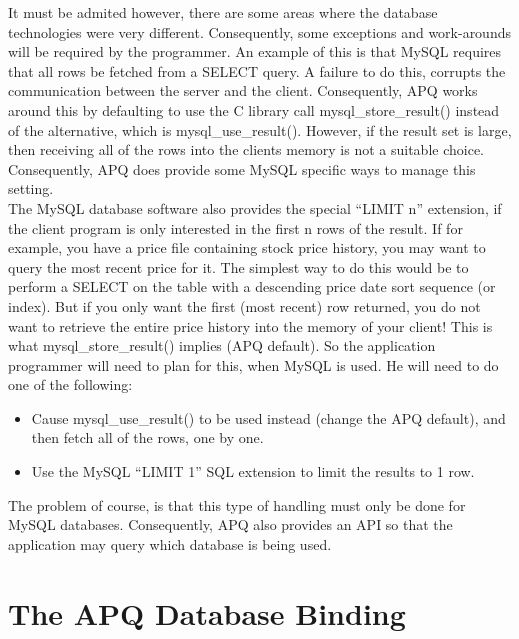 \documentclass[english,letterpaper]{book}
\begin{document}
It must be admited however, there are some areas where the database
technologies were very different. Consequently, some exceptions and
work-arounds will be required by the programmer. An example of this
is that MySQL requires that all rows be fetched from a SELECT query.
A failure to do this, corrupts the communication between the server
and the client. Consequently, APQ works around this by defaulting
to use the C library call mysql\_store\_result() instead of the alternative,
which is mysql\_use\_result(). However, if the result set is large,
then receiving all of the rows into the clients memory is not a suitable
choice. Consequently, APQ does provide some MySQL specific ways to
manage this setting.\\ 

The MySQL database software also provides the special ``LIMIT n''
extension, if the client program is only interested in the first n
rows of the result. If for example, you have a price file containing
stock price history, you may want to query the most recent price for
it. The simplest way to do this would be to perform a SELECT on the
table with a descending price date sort sequence (or index). But if
you only want the first (most recent) row  returned, you do not want
to retrieve the entire price history into the memory of your client!
This is what mysql\_store\_result() implies (APQ default). So the
application programmer will need to plan for this, when MySQL is used.
He will need to do one of the following:

\begin{itemize}
   \item Cause mysql\_use\_result() to be used instead (change the APQ default),
         and then fetch all of the rows, one by one.
   \item Use the MySQL ``LIMIT 1'' SQL extension to limit the results to
         1 row.
\end{itemize}

The problem of course, is that this type of handling must only be
done for MySQL databases. Consequently, APQ also provides an API so
that the application may query which database is being used.


\section{The APQ Database Binding}
\end{document}
